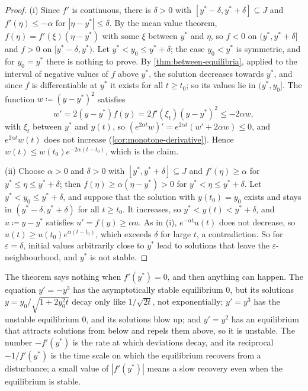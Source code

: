 \begin{proof}
(i) Since $f'$ is continuous, there is $\delta>0$ with $[y^*-\delta,y^*+\delta]\subseteq J$ and $f'(\eta)\le-\alpha$ for $|\eta-y^*|\le\delta$. By the mean value theorem, $f(\eta)=f'(\xi)(\eta-y^*)$ with some $\xi$ between $y^*$ and $\eta$, so $f<0$ on $(y^*,y^*+\delta]$ and $f>0$ on $[y^*-\delta,y^*)$. Let $y^*<y_0\le y^*+\delta$; the case $y_0<y^*$ is symmetric, and for $y_0=y^*$ there is nothing to prove. By \cref{thm:between-equilibria}, applied to the interval of negative values of $f$ above $y^*$, the solution decreases towards $y^*$, and since $f$ is differentiable at $y^*$ it exists for all $t\ge t_0$; so its values lie in $(y^*,y_0]$. The function $w\coloneqq(y-y^*)^2$ satisfies
\[
w'=2(y-y^*)f(y)=2f'(\xi_t)(y-y^*)^2\le-2\alpha w ,
\]
with $\xi_t$ between $y^*$ and $y(t)$, so $(e^{2\alpha t}w)'=e^{2\alpha t}(w'+2\alpha w)\le0$, and $e^{2\alpha t}w(t)$ does not increase (\cref{cor:monotone-derivative}). Hence $w(t)\le w(t_0)e^{-2\alpha(t-t_0)}$, which is the claim.

(ii) Choose $\alpha>0$ and $\delta>0$ with $[y^*,y^*+\delta]\subseteq J$ and $f'(\eta)\ge\alpha$ for $y^*\le\eta\le y^*+\delta$; then $f(\eta)\ge\alpha(\eta-y^*)>0$ for $y^*<\eta\le y^*+\delta$. Let $y^*<y_0\le y^*+\delta$, and suppose that the solution with $y(t_0)=y_0$ exists and stays in $(y^*-\delta,y^*+\delta)$ for all $t\ge t_0$. It increases, so $y^*<y(t)<y^*+\delta$, and $u\coloneqq y-y^*$ satisfies $u'=f(y)\ge\alpha u$. As in (i), $e^{-\alpha t}u(t)$ does not decrease, so $u(t)\ge u(t_0)e^{\alpha(t-t_0)}$, which exceeds $\delta$ for large $t$, a contradiction. So for $\varepsilon=\delta$, initial values arbitrarily close to $y^*$ lead to solutions that leave the $\varepsilon$-neighbourhood, and $y^*$ is not stable.
\end{proof}

The theorem says nothing when $f'(y^*)=0$, and then anything can happen. The equation $y'=-y^3$ has the asymptotically stable equilibrium $0$, but its solutions $y=y_0/\sqrt{1+2y_0^2t}$ decay only like $1/\sqrt{2t}$, not exponentially; $y'=y^3$ has the unstable equilibrium $0$, and its solutions blow up; and $y'=y^2$ has an equilibrium that attracts solutions from below and repels them above, so it is unstable. The number $-f'(y^*)$ is the rate at which deviations decay, and its reciprocal $-1/f'(y^*)$ is the time scale on which the equilibrium recovers from a disturbance; a small value of $|f'(y^*)|$ means a slow recovery even when the equilibrium is stable.

